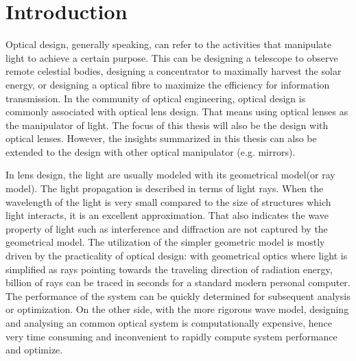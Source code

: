 \chapter{Introduction}
\label{chapter_1_intro}
\graphicspath{ {./chapter-sp/figures/} }
\captionsetup[figure]{labelfont=bf}
\captionsetup{margin=1.5em}
\captionsetup[table]{labelfont=bf}


Optical design, generally speaking, can refer to the activities that manipulate light to achieve a certain purpose. This can be designing a telescope to observe remote celestial bodies, designing a concentrator to maximally harvest the solar energy, or designing a optical fibre to maximize the efficiency for information transmission. In the community of optical engineering, optical design is commonly associated with optical lens design. That means using optical lenses as the manipulator of light. The focus of this thesis will also be the design with optical lenses. However, the insights summarized in this thesis can also be extended to the design with other optical manipulator (e.g. mirrors).

In lens design, the light are usually modeled with its geometrical model(or ray model). The light propagation is described in terms of light rays. When the wavelength of the light is very small compared to the size of structures which light interacts, it is an excellent approximation. That also indicates the wave property of light such as interference and diffraction are not captured by the geometrical model. The utilization of the simpler geometric model is mostly driven by the practicality of optical design: with geometrical optics where light is simplified as rays pointing towards the traveling direction of radiation energy, billion of rays can be traced in seconds for a standard modern personal computer. The performance of the system can be quickly determined for subsequent analysis or optimization. On the other side, with the more rigorous wave model, designing and analysing an common optical system is computationally expensive, hence very time consuming and inconvenient to rapidly compute system performance and optimize.   


